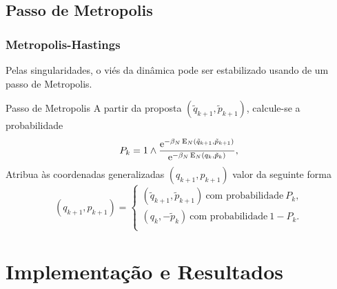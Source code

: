 \subsection{Passo de Metropolis}
\begin{frame}
	\frametitle{Metropolis-Hastings}
	Pelas singularidades, o viés da dinâmica pode ser estabilizado usando de um passo de Metropolis.
	
	\pause
	
	\begin{block}{Passo de Metropolis}
		A partir da proposta $(\tilde{q}_{k+1},\tilde{p}_{k+1})$, calcule-se a probabilidade
		\[
			P_k = 1 \wedge \frac{\operatorname{e}^{-\beta_N \operatorname{E}_N(\tilde{q}_{k+1}, \tilde{p}_{k+1})}}{\operatorname{e}^{-\beta_N \operatorname{E}_N(q_{k}, \tilde{p}_{k})}},
		\]
		Atribua às coordenadas generalizadas $(q_{k+1}, p_{k+1})$ valor da seguinte forma
		\[
			(q_{k+1}, p_{k+1}) =
			\begin{cases}
				(\tilde{q}_{k+1}, \tilde{p}_{k+1}) \ \text{com 	probabilidade} \ P_k, \\
				(q_k, -\tilde{p}_{k}) \ \text{com probabilidade} \ 	1-P_k. \\
			\end{cases}
		\]
	\end{block}

\end{frame}


\section{Implementação e Resultados}

